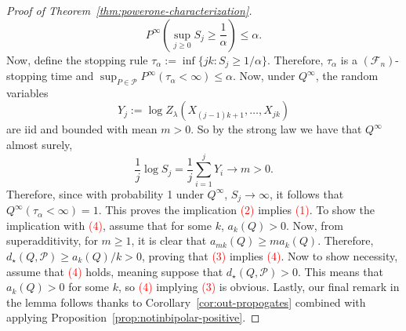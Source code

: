 \documentclass[11pt]{article}
\newcommand{\Pcal}{\mathcal{P}}
\theoremstyle{definition}
\theoremstyle{definition}
\begin{document}
\begin{proof}[Proof of Theorem~\ref{thm:powerone-characterization}]
\[
P^\infty\left(\sup_{j\ge 0} S_j\ge \frac{1}{\alpha}\right)\le \alpha.
\]
Now, define the stopping rule $\tau_{\alpha}:=\inf\{jk: S_j\ge 1/\alpha\}$. Therefore, $\tau_{\alpha}$ is a $(\mathcal F_n)$-stopping time and $\sup_{P\in\Pcal}P^{\infty}(\tau_\alpha<\infty)\le\alpha$. Now, under $Q^\infty$, the random variables
\[
Y_j:=\log Z_\lambda(X_{(j-1)k+1},\dots,X_{jk})
\]
are iid and bounded with mean $m>0$. So by the strong law we have that $Q^{\infty}$ almost surely,
\[
\frac{1}{j}\log S_j = \frac{1}{j}\sum_{i=1}^j Y_i \longrightarrow m>0.
\]
Therefore, since with probability 1 under $Q^{\infty}$, $S_j\to\infty$, it follows that $Q^{\infty}(\tau_{\alpha}<\infty)=1$. This proves the implication \textcolor{red}{(2)} implies \textcolor{red}{(1)}. To show the implication with \textcolor{red}{(4)}, assume that for some $k$, $a_k(Q)>0$. Now, from superadditivity, for $m\ge 1$, it is clear that $a_{mk}(Q)\ge ma_k(Q)$. Therefore, $d_{\star}(Q,\Pcal)\ge a_k(Q)/k >0$, proving that \textcolor{red}{(3)} implies \textcolor{red}{(4)}. Now to show necessity, assume that \textcolor{red}{(4)} holds, meaning suppose that $d_{\star}(Q,\Pcal)>0$. This means that $a_k(Q)>0$ for some $k$, so \textcolor{red}{(4)} implying \textcolor{red}{(3)} is obvious. Lastly, our final remark in the lemma follows thanks to Corollary~\ref{cor:out-propogates} combined with applying Proposition~\ref{prop:notinbipolar-positive}.
\end{proof}
\end{document}

